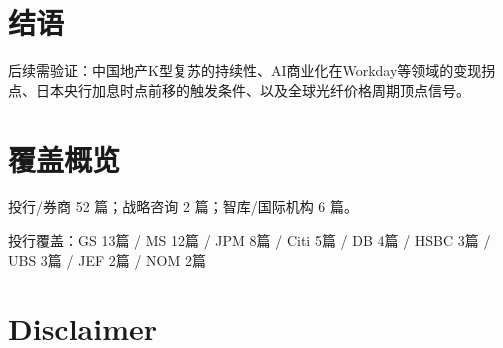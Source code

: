 \documentclass[11pt]{ctexart}
\begin{document}
\section{结语}
后续需验证：中国地产K型复苏的持续性、AI商业化在Workday等领域的变现拐点、日本央行加息时点前移的触发条件、以及全球光纤价格周期顶点信号。
\newpage
\section{覆盖概览}
投行/券商 52 篇；战略咨询 2 篇；智库/国际机构 6 篇。\par
投行覆盖：GS 13篇 / MS 12篇 / JPM 8篇 / Citi 5篇 / DB 4篇 / HSBC 3篇 / UBS 3篇 / JEF 2篇 / NOM 2篇\par
\section{Disclaimer}
\end{document}
